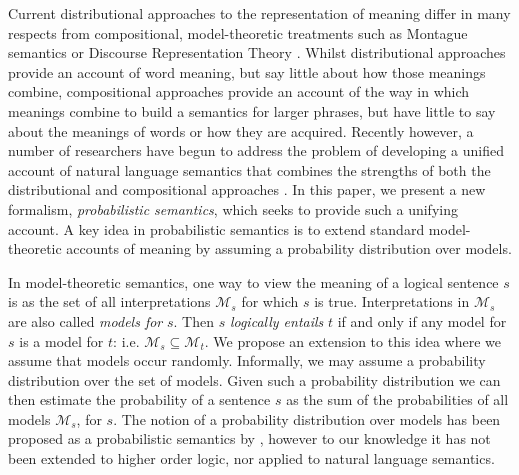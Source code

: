 \documentclass[letterpaper]{article}
\newcommand{\citet}[1]{\newcite{#1}}
\begin{document}
Current distributional approaches to the representation of meaning differ in many respects from compositional, model-theoretic treatments
such as Montague semantics or
Discourse Representation Theory \cite{Blackburn:05}. Whilst distributional approaches provide an account of word meaning, but say little about how those meanings combine, compositional approaches provide an account of the way in which meanings combine to build a semantics for larger phrases, but have little to say about the meanings of words or how they are acquired.  Recently however, a number of researchers have begun to address the problem of  developing a unified account of natural language semantics that combines the strengths of both the distributional and compositional approaches
\cite{Clarke:07,Coecke:10,Garrette:11,Lewis:13}.  In this paper, we present a new formalism, {\em probabilistic semantics\/}, which seeks to provide such a unifying
account. A key idea in probabilistic semantics is to extend standard model-theoretic
accounts of meaning by assuming a probability distribution over
models.  

In model-theoretic semantics, one way to view the meaning
of a logical sentence $s$ is as the set of all interpretations
$\mathcal{M}_s$ for which $s$ is true. Interpretations in $\mathcal{M}_s$ are also called {\em models for\/}
$s$. Then $s$ {\em logically entails\/} $t$ if and only if any model for $s$ is a model for $t$: i.e. $\mathcal{M}_s \subseteq
\mathcal{M}_t$. We propose an extension to this idea where we assume
that models occur randomly. Informally, we may assume a probability
distribution over the set of models. Given such a probability distribution we can then estimate the
probability of a sentence $s$ as the sum of the probabilities of all
models $\mathcal{M}_s$, for $s$. The notion of a probability
distribution over models has been proposed as a probabilistic
semantics by \citet{Sato:95}, however to our knowledge it has not been
extended to higher order logic, nor applied to natural language
semantics.
\end{document}
